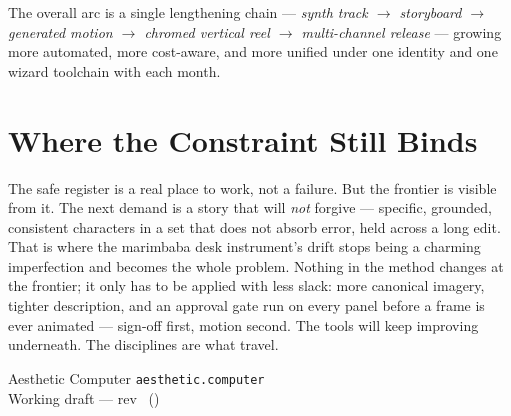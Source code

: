 \documentclass[10pt,letterpaper,twocolumn]{article}
\begin{document}
The overall arc is a single lengthening chain --- \emph{synth track $\to$
storyboard $\to$ generated motion $\to$ chromed vertical reel $\to$
multi-channel release} --- growing more automated, more cost-aware, and more
unified under one identity and one wizard toolchain with each month.

\section{Where the Constraint Still Binds}
\label{sec:frontier}

The safe register is a real place to work, not a failure. But the frontier
is visible from it. The next demand is a story that will \emph{not} forgive
--- specific, grounded, consistent characters in a set that does not
absorb error, held across a long edit. That is where the marimbaba desk
instrument's drift stops being a charming imperfection and becomes the
whole problem. Nothing in the method changes at the frontier; it only has
to be applied with less slack: more canonical imagery, tighter description,
and an approval gate run on every panel before a frame is ever animated ---
sign-off first, motion second. The tools will keep improving underneath. The
disciplines are what travel.

\vfill
\begin{center}
  \footnotesize\color{acgray}
  Aesthetic Computer \; \textperiodcentered \; \texttt{aesthetic.computer} \\
  Working draft --- rev \paperrev\ (\paperhash)
\end{center}
\end{document}
